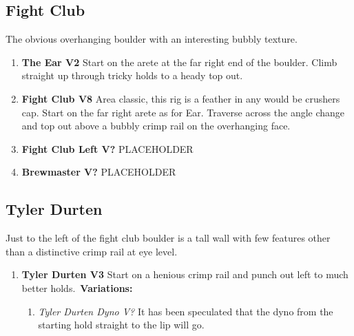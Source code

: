 \subsection*{Fight Club}\label{bf:Fight Club}
The obvious overhanging boulder with an interesting bubbly texture.

\label{pt:Fight Club}
\begin{enumerate}[resume]
	\item\label{rt:The Ear} \colorbox{green!20}{\textbf{The Ear V2     } }
	\newline Start on the arete at the far right end of the boulder. Climb straight up through tricky holds to a heady top out.\
	\item\label{rt:Fight Club} \colorbox{Goldenrod!50}{\textbf{Fight Club V8     } }
	\newline Area classic, this rig is a feather in any would be crushers cap. Start on the far right arete as for Ear. Traverse across the angle change and top out above a bubbly crimp rail on the overhanging face.\
	\item\label{rt:Fight Club Left} \colorbox{black!20}{\textbf{Fight Club Left V?  } }
	\newline PLACEHOLDER\
	\item\label{rt:Brewmaster} \colorbox{black!20}{\textbf{Brewmaster V?  } }
	\newline PLACEHOLDER\
\end{enumerate}
\subsection*{Tyler Durten}\label{bf:Tyler Durten}
Just to the left of the fight club boulder is a tall wall with few features other than a distinctive crimp rail at eye level.

\begin{enumerate}[resume]
	\item\label{rt:Tyler Durten} \colorbox{green!20}{\textbf{Tyler Durten V3   } }
	\newline Start on a henious crimp rail and punch out left to much better holds.\
	\newline \textbf{Variations:}
	\begin{enumerate}
		\item\label{vr:Tyler Durten Dyno} \colorbox{black!20}{\emph{Tyler Durten Dyno V?  }  }
		\newline It has been speculated that the dyno from the starting hold straight to the lip will go.\
	\end{enumerate}
\end{enumerate}
